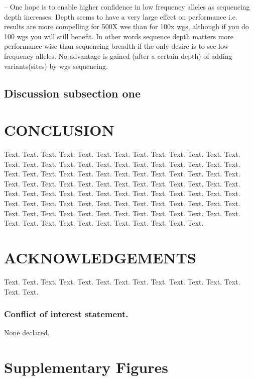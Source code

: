 \documentclass[a4,center,fleqn]{NAR}
\begin{document}
-- One hope is to enable higher confidence in low frequency alleles as sequencing depth increases. Depth seems to have a very large effect on performance i.e. results are more compelling for 500X wes than for 100x wgs, although if you do 100 wgs you will still benefit.
In other words sequence depth matters more performance wise than sequencing breadth if the only desire is to see low frequency alleles. No advantage is gained (after a certain depth) of adding variants(sites) by wgs sequencing.
\subsection{Discussion subsection one}



\section{CONCLUSION}

Text. Text. Text. Text. Text. Text. Text. Text. Text. Text. Text.
Text. Text. Text. Text. Text. Text. Text. Text. Text. Text. Text.
Text. Text. Text. Text. Text. Text. Text. Text. Text. Text. Text.
Text. Text. Text. Text. Text. Text. Text. Text. Text. Text. Text.
Text. Text. Text. Text. Text. Text. Text. Text. Text. Text. Text.
Text. Text. Text. Text. Text. Text. Text. Text. Text. Text. Text.
Text. Text. Text. Text. Text. Text. Text. Text. Text. Text. Text.
Text. Text. Text. Text. Text. Text. Text. Text. Text. Text. Text.
Text. Text. Text. Text. Text. Text. Text. Text. Text. Text. Text.
Text. Text. Text.


\section{ACKNOWLEDGEMENTS}

Text. Text. Text. Text. Text. Text. Text. Text. Text. Text. Text.
Text. Text. Text. Text.


\subsubsection{Conflict of interest statement.} None declared.






\section{Supplementary Figures}
\end{document}
